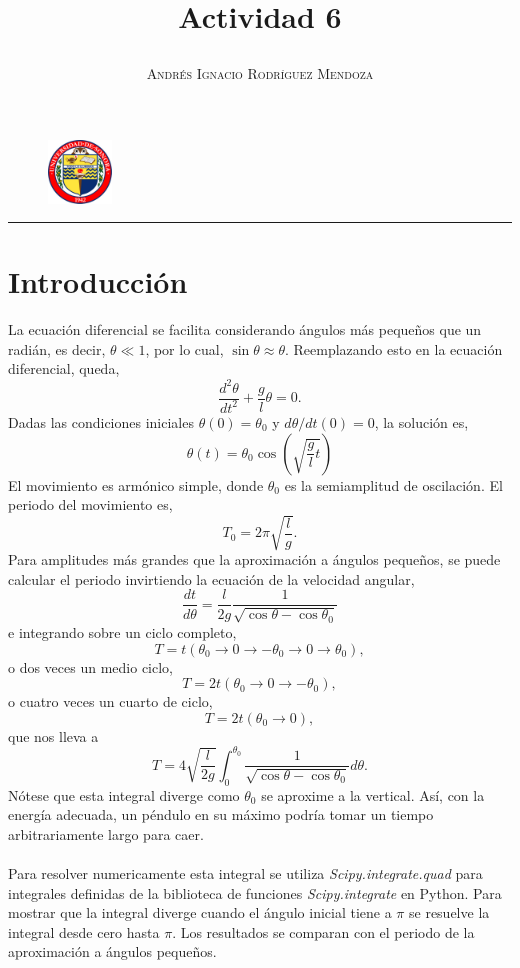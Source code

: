 \documentclass[11pt,spanish]{article}
\title{\vspace{-3cm}\begin{flushleft}\textbf{Actividad 6}\end{flushleft}}
\author{\hspace{-9.6cm}\textsc{Andrés Ignacio Rodríguez Mendoza}}
\date{}
\begin{document}
\begin{figure}
  \begin{center}
   \vspace{-5.4cm} \includegraphics[width=0.15\textwidth]{uni}
  \end{center}
\end{figure}

\maketitle  
\begin{center}
\rule{\textwidth}{1pt}
\end{center}


\section*{Introducción}

La ecuación diferencial se facilita considerando ángulos más pequeños que un radián, es decir, $\theta \ll  1$, por lo cual, $\sin \theta \approx \theta$. Reemplazando esto en la ecuación diferencial, queda,
$$\frac{d^2\theta}{dt^2} + \frac{g}{l} \theta = 0.$$
Dadas las condiciones iniciales $\theta (0) = \theta _ 0$ y $d\theta / dt (0) =0$, la solución es,
$$\theta (t) = \theta _0 \cos \left( \sqrt{\frac{g}{l} t} \right)$$
El movimiento es armónico simple, donde $\theta_0$ es la semiamplitud de oscilación. El periodo del movimiento es,
$$T_0 = 2 \pi \sqrt{\frac{l}{g}}.$$
Para amplitudes más grandes que la aproximación a ángulos pequeños, se puede calcular el periodo invirtiendo la ecuación de la velocidad angular,
$$\frac{dt}{d\theta}=\frac{l}{2g} \frac{1}{\sqrt{\cos \theta - \cos \theta_0}}$$
e integrando sobre un ciclo completo,
$$ T= t(\theta _0 \rightarrow 0 \rightarrow -\theta_0 \rightarrow 0 \rightarrow \theta_0),$$
o dos veces un medio ciclo,
$$ T= 2t(\theta _0 \rightarrow 0 \rightarrow -\theta_0),$$
o cuatro veces un cuarto de ciclo,
$$ T= 2t(\theta _0 \rightarrow 0),$$
que nos lleva a
$$T= 4 \sqrt{\frac{l}{2g}} \int ^{\theta _0} _0 \frac{1}{\sqrt{\cos\theta - \cos\theta_0}} d\theta.$$
Nótese que esta integral diverge como $\theta_0$ se aproxime a la vertical. Así, con la energía adecuada, un péndulo en su máximo podría tomar un tiempo arbitrariamente largo para caer.\\ \\
Para resolver numericamente esta integral se utiliza \textit{Scipy.integrate.quad} para integrales definidas de la biblioteca de funciones \textit{Scipy.integrate} en Python. Para mostrar que la integral diverge cuando el ángulo inicial tiene a $\pi$ se resuelve la integral desde cero hasta $\pi$. Los resultados se comparan con el periodo de la aproximación a ángulos pequeños.
\end{document}
